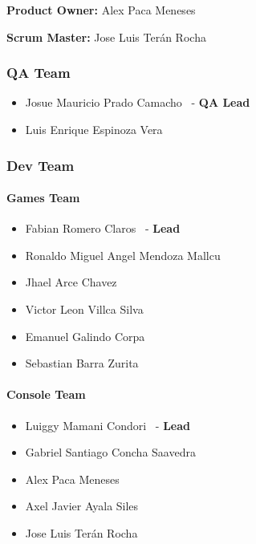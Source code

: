 \documentclass{article}
\providecommand{\tightlist}{
  \setlength{\itemsep}{0pt}\setlength{\parskip}{0pt}}
\begin{document}
\textbf{Product Owner:}
Alex Paca Meneses

\textbf{Scrum Master:}
Jose Luis Terán Rocha

\hypertarget{qateam-3}{
\subsubsection{\texorpdfstring{\textbf{QA Team}}{QA Team}}\label{qateam-3}}

\begin{itemize}
\tightlist
\item
  Josue Mauricio Prado Camacho ~- \textbf{QA Lead}
\item
  Luis Enrique Espinoza Vera
\end{itemize}

\hypertarget{devteam-3}{
\subsubsection{\texorpdfstring{\textbf{Dev
Team}}{Dev Team}}\label{devteam-3}}

\paragraph{Games Team}\label{games-team-3}

\begin{itemize}
\tightlist
\item
  Fabian Romero Claros ~-
  \textbf{Lead}
\item
  Ronaldo Miguel Angel Mendoza Mallcu
\item
  Jhael Arce Chavez
\item
  Victor Leon Villca Silva
\item
  Emanuel Galindo Corpa
\item
  Sebastian Barra Zurita
\end{itemize}

\paragraph{Console Team}\label{console-team-3}

\begin{itemize}
\tightlist
\item
  Luiggy Mamani Condori ~- \textbf{Lead}
\item
  Gabriel Santiago Concha Saavedra
\item
  Alex Paca Meneses
\item
  Axel Javier Ayala Siles
\item
  Jose Luis Terán Rocha
\end{itemize}
\end{document}

